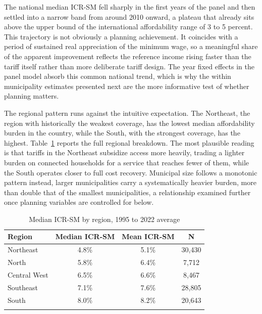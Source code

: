 \documentclass[pdflatex,sn-mathphys-num]{sn-jnl}%
\theoremstyle{thmstyleone}%
\theoremstyle{thmstyletwo}%
\theoremstyle{thmstylethree}%
\begin{document}
The national median ICR-SM fell sharply in the first years of the panel and then settled into a narrow band from around 2010 onward, a plateau that already sits above the upper bound of the international affordability range of 3 to 5 percent. This trajectory is not obviously a planning achievement. It coincides with a period of sustained real appreciation of the minimum wage, so a meaningful share of the apparent improvement reflects the reference income rising faster than the tariff itself rather than more deliberate tariff design. The year fixed effects in the panel model absorb this common national trend, which is why the within municipality estimates presented next are the more informative test of whether planning matters.

The regional pattern runs against the intuitive expectation. The Northeast, the region with historically the weakest coverage, has the lowest median affordability burden in the country, while the South, with the strongest coverage, has the highest. Table~\ref{tab_icr_regiao} reports the full regional breakdown. The most plausible reading is that tariffs in the Northeast subsidize access more heavily, trading a lighter burden on connected households for a service that reaches fewer of them, while the South operates closer to full cost recovery. Municipal size follows a monotonic pattern instead, larger municipalities carry a systematically heavier burden, more than double that of the smallest municipalities, a relationship examined further once planning variables are controlled for below.

\begin{table}[h]
\caption{Median ICR-SM by region, 1995 to 2022 average}\label{tab_icr_regiao}
\begin{tabular}{@{}lccc@{}}
\toprule
Region & Median ICR-SM & Mean ICR-SM & N \\
\midrule
Northeast     & 4.8\% & 5.1\% & 30,430 \\
North         & 5.8\% & 6.4\% & 7,712 \\
Central West  & 6.5\% & 6.6\% & 8,467 \\
Southeast     & 7.1\% & 7.6\% & 28,805 \\
South         & 8.0\% & 8.2\% & 20,643 \\
\botrule
\end{tabular}
\end{table}
\end{document}
